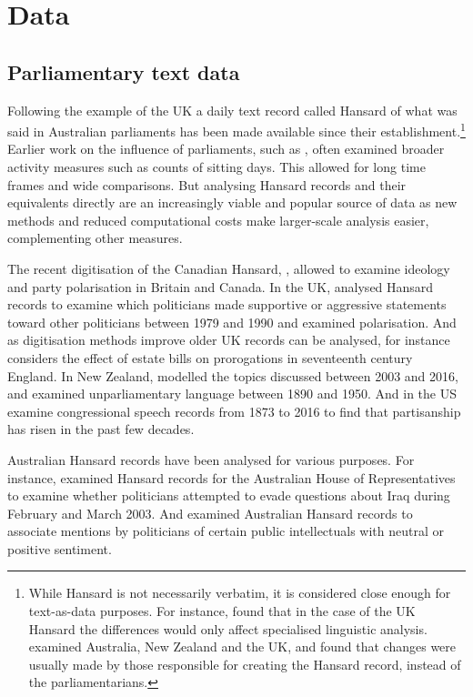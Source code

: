 \documentclass[12pt,]{article}
\theoremstyle{definition}
\theoremstyle{definition}
\theoremstyle{definition}
\theoremstyle{remark}
\begin{document}
\section{Data}\label{data}

\subsection{Parliamentary text data}\label{parliamentary-text-data}

Following the example of the UK a daily text record called Hansard of
what was said in Australian parliaments has been made available since
their establishment.\footnote{While Hansard is not necessarily verbatim,
  it is considered close enough for text-as-data purposes. For instance,
  \citet{Mollin2008} found that in the case of the UK Hansard the
  differences would only affect specialised linguistic analysis.
  \citet{Edwards2016} examined Australia, New Zealand and the UK, and
  found that changes were usually made by those responsible for creating
  the Hansard record, instead of the parliamentarians.} Earlier work on
the influence of parliaments, such as \citet{ZandenBuringhBosker2012},
often examined broader activity measures such as counts of sitting days.
This allowed for long time frames and wide comparisons. But analysing
Hansard records and their equivalents directly are an increasingly
viable and popular source of data as new methods and reduced
computational costs make larger-scale analysis easier, complementing
other measures.

The recent digitisation of the Canadian Hansard, \citet{BeelenEtc2017},
allowed \citet{RheaultCochran2018} to examine ideology and party
polarisation in Britain and Canada. In the UK, \citet{Duthie2016}
analysed Hansard records to examine which politicians made supportive or
aggressive statements toward other politicians between 1979 and 1990 and
\citet{PetersonSpirling2018} examined polarisation. And as digitisation
methods improve older UK records can be analysed, for instance
\citet{Dimitruk2018} considers the effect of estate bills on
prorogations in seventeenth century England. In New Zealand,
\citet{Curran2017} modelled the topics discussed between 2003 and 2016,
and \citet{Graham2016} examined unparliamentary language between 1890
and 1950. And in the US \citet{GentzkowShapiroTaddy2018} examine
congressional speech records from 1873 to 2016 to find that partisanship
has risen in the past few decades.

Australian Hansard records have been analysed for various purposes. For
instance, \citet{Rasiah2010} examined Hansard records for the Australian
House of Representatives to examine whether politicians attempted to
evade questions about Iraq during February and March 2003. And
\citet{GansLeigh2012} examined Australian Hansard records to associate
mentions by politicians of certain public intellectuals with neutral or
positive sentiment.
\end{document}
